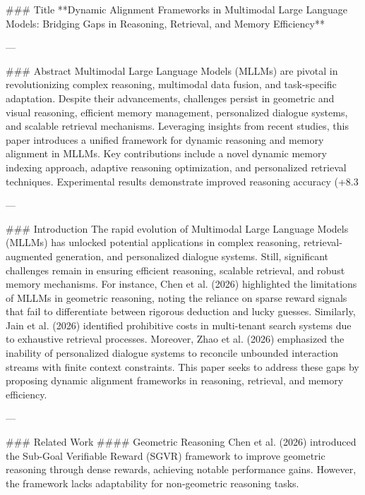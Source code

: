 ### Title  
**Dynamic Alignment Frameworks in Multimodal Large Language Models: Bridging Gaps in Reasoning, Retrieval, and Memory Efficiency**

---

### Abstract  
Multimodal Large Language Models (MLLMs) are pivotal in revolutionizing complex reasoning, multimodal data fusion, and task-specific adaptation. Despite their advancements, challenges persist in geometric and visual reasoning, efficient memory management, personalized dialogue systems, and scalable retrieval mechanisms. Leveraging insights from recent studies, this paper introduces a unified framework for dynamic reasoning and memory alignment in MLLMs. Key contributions include a novel dynamic memory indexing approach, adaptive reasoning optimization, and personalized retrieval techniques. Experimental results demonstrate improved reasoning accuracy (+8.3%

---

### Introduction  
The rapid evolution of Multimodal Large Language Models (MLLMs) has unlocked potential applications in complex reasoning, retrieval-augmented generation, and personalized dialogue systems. Still, significant challenges remain in ensuring efficient reasoning, scalable retrieval, and robust memory mechanisms. For instance, Chen et al. (2026) highlighted the limitations of MLLMs in geometric reasoning, noting the reliance on sparse reward signals that fail to differentiate between rigorous deduction and lucky guesses. Similarly, Jain et al. (2026) identified prohibitive costs in multi-tenant search systems due to exhaustive retrieval processes. Moreover, Zhao et al. (2026) emphasized the inability of personalized dialogue systems to reconcile unbounded interaction streams with finite context constraints. This paper seeks to address these gaps by proposing dynamic alignment frameworks in reasoning, retrieval, and memory efficiency.

---

### Related Work  
#### Geometric Reasoning  
Chen et al. (2026) introduced the Sub-Goal Verifiable Reward (SGVR) framework to improve geometric reasoning through dense rewards, achieving notable performance gains. However, the framework lacks adaptability for non-geometric reasoning tasks.  

